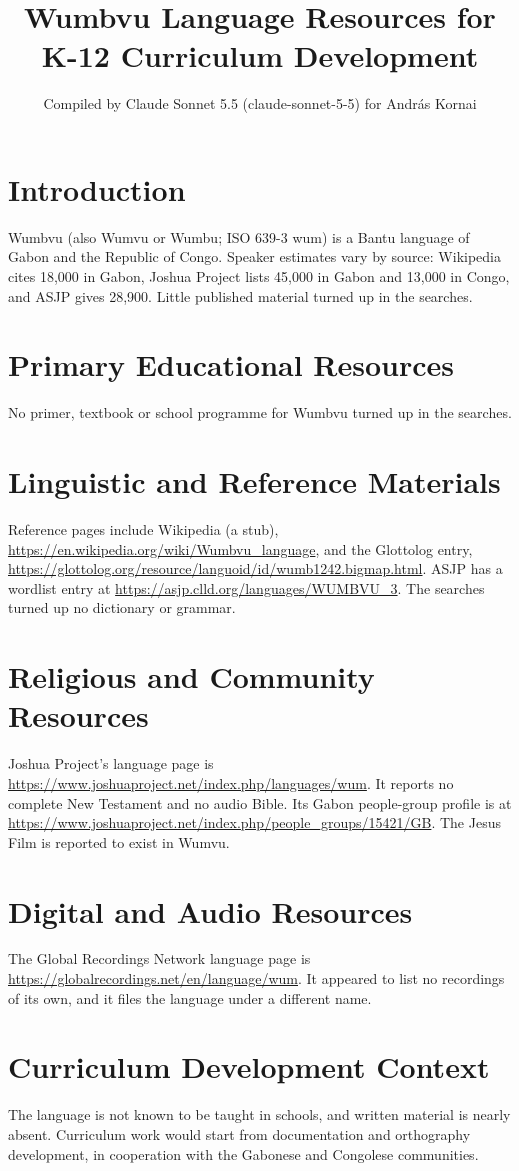 \documentclass[12pt]{article}
\title{Wumbvu Language Resources for K-12 Curriculum Development}
\author{Compiled by Claude Sonnet 5.5 (claude-sonnet-5-5) for Andr\'as Kornai}
\date{}
\begin{document}
\maketitle

\section{Introduction}
Wumbvu (also Wumvu or Wumbu; ISO 639-3 wum) is a Bantu language of Gabon and the Republic of Congo. Speaker estimates vary by source: Wikipedia cites 18,000 in Gabon, Joshua Project lists 45,000 in Gabon and 13,000 in Congo, and ASJP gives 28,900. Little published material turned up in the searches.

\section{Primary Educational Resources}
No primer, textbook or school programme for Wumbvu turned up in the searches.

\section{Linguistic and Reference Materials}
Reference pages include Wikipedia (a stub), \url{https://en.wikipedia.org/wiki/Wumbvu_language}, and the Glottolog entry, \url{https://glottolog.org/resource/languoid/id/wumb1242.bigmap.html}. ASJP has a wordlist entry at \url{https://asjp.clld.org/languages/WUMBVU_3}. The searches turned up no dictionary or grammar.

\section{Religious and Community Resources}
Joshua Project's language page is \url{https://www.joshuaproject.net/index.php/languages/wum}. It reports no complete New Testament and no audio Bible. Its Gabon people-group profile is at \url{https://www.joshuaproject.net/index.php/people_groups/15421/GB}. The Jesus Film is reported to exist in Wumvu.

\section{Digital and Audio Resources}
The Global Recordings Network language page is \url{https://globalrecordings.net/en/language/wum}. It appeared to list no recordings of its own, and it files the language under a different name.

\section{Curriculum Development Context}
The language is not known to be taught in schools, and written material is nearly absent. Curriculum work would start from documentation and orthography development, in cooperation with the Gabonese and Congolese communities.
\end{document}
